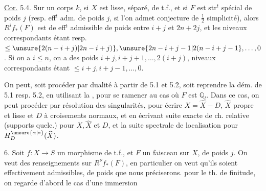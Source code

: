 
\uline{Cor.} 5.4. Sur un corps $k$, si $X$ est lisse, séparé, de t.f., et si $F$ est  str$^{t}$ spécial de poids $j$ (resp. eff$^{t}$ adm. de poids $j$, si l'on admet conjecture de $\frac12$ simplicité), alors $R^if_*(F)$ est de eff$^{t}$ admissible de poids entre $i+j$ et $2n+2j$, et les niveaux correspondants étant resp. $\leq\unsure{2(n-i+j)|2n-i+j)},\unsure{2n-i+j-1|2(n-i+j-1},\ldots,0$. Si on a $i\leq n$, on a  des poids  $i+j,i+j+1,\ldots,2(i+j)$,  niveaux correspondants étant $\leq i+j,i+j-1,\ldots,0$.


On peut, soit procéder par dualité à partir de 5.1 et 5.2, soit reprendre  la dém. de 5.1 resp. 5.2, en utilisant la  , pour se ramener au cas où $F$ est $\mathbb Q_l$. Dans ce cas, on peut procéder par  résolution des singularités, pour écrire $X=\widehat X-D$, $\widehat X$  propre et lisse et $D$  à croisements normaux, et en écrivant suite exacte de ch. relative (supports quelc.) pour $X,\widehat X$ et $D$, et la suite spectrale de localisation pour $H^{\unsure{\alpha|*}}_D(\widehat X)$.


6. Soit $f:X\longrightarrow S$ un morphisme de t.f., et $F$ un faisceau  sur $X$, de poids $j$. On veut des renseignements sur  $R^\nu f_*(F)$, en particulier on veut qu'ils soient effectivement admissibles, de poids que nous préciserons.   pour le th. de finitude, on regarde d'abord le cas d'une immersion
